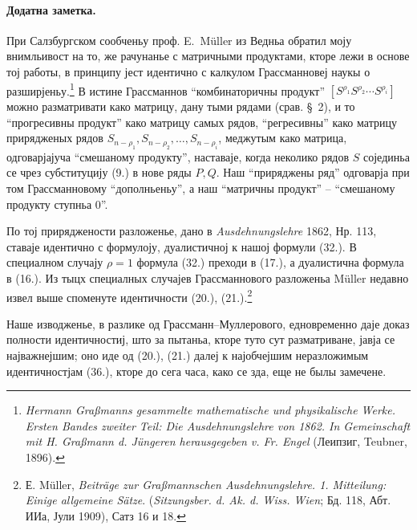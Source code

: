 ﻿\documentclass[11pt]{article}
\begin{document}
\paragraph{Додатна заметка.} При Салзбургском сообченьу проф. \mbox{E. Müller} из Ведньа обратил моју внимльивост на то, же рачунанье с матричными продуктами, кторе лежи в основе тој работы, в принципу јест идентично с калкулом Грассманновеј наукы о разширјеньу.\footnote{\emph{Hermann Graßmanns gesammelte mathematische und physikalische Werke. Ersten Bandes zweiter Teil: Die Ausdehnungslehre von 1862. In Gemeinschaft mit H. Graßmann d. Jüngeren herausgegeben v. Fr. Engel} (Леипзиг, Teubner, 1896).} В истине Грассманнов ``комбинаторичны продукт'' $[S^{\rho_1}S^{\rho_2}\cdots S^{\rho_i}]$ можно разматривати како матрицу, дану тыми рядами (срав. \S\ 2), и то ``прогресивны продукт'' како матрицу самых рядов, ``регресивны'' како матрицу прирядженых рядов $S_{n-\rho_1},S_{n-\rho_2},\ldots,S_{n-\rho_i}$, меджутым како матрица, одговарјајуча ``смешаному продукту'', наставаје, когда неколико рядов $S$ сојединьа се чрез субституцију (9.) в нове ряды $P,Q$. Наш ``приряджены ряд'' одговарја при том Грассманновому ``дополньеньу'', а наш ``матричны продукт'' -- ``смешаному продукту ступньа 0''.

По тој приряджености разложенье, дано в \emph{Ausdehnungslehre} 1862, Нр. 113, ставаје идентично с формулоју, дуалистичној к нашој формули (32.). В специалном случају $\rho=1$ формула (32.) преходи в (17.), а дуалистична формула в (16.). Из тыцх специалных случајев Грассманнового разложеньа \mbox{Müller} недавно извел выше споменуте идентичности (20.), (21.).\footnote{Е. \mbox{Müller}, \emph{Beiträge zur Graßmannschen Ausdehnungslehre. 1. Mitteilung: Einige allgemeine Sätze}. (\emph{Sitzungsber. d. Ak. d. Wiss. Wien}; Бд. 118, Абт. ИИа, Јули 1909), Сатз 16 и 18.}

Наше изводженье, в разлике од Грассманн--Муллерового, едновременно даје доказ полности идентичностиј, што за пытаньа, кторе туто сут разматриване, јавја се најважнејшим; оно иде од (20.), (21.) далеј к најобчејшим неразложимым идентичностјам (36.), кторе до сега часа, како се зда, еще не былы замечене.
\end{document}
